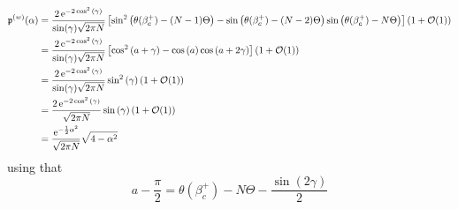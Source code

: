 \begin{align}
		\mathfrak{p}^{(w)}(\alpha) & =  \frac{2 \operatorname{e}^{-2\cos^2{(\gamma)}}}{\sin(\gamma) \sqrt{2\pi N}} \left[\sin^2{\left(\theta(\beta_c^+)-(N-1)\Theta \right)} - \sin{\left(\theta(\beta_c^+)-(N-2)\Theta\right)}  \sin{\left(\theta(\beta_c^+)-N\Theta \right)} \right] \left(1 + \mathcal{O}(1) \right) \\
		& =  \frac{2 \operatorname{e}^{-2\cos^2{(\gamma)}}}{\sin(\gamma) \sqrt{2\pi N}} \left[\cos^2{\left(a + \gamma \right)} - \cos{\left( a \right)} \cos{\left(a + 2\gamma \right)}  \right] \left(1 + \mathcal{O}(1) \right) \\
		& =  \frac{2 \operatorname{e}^{-2\cos^2{(\gamma)}}}{\sin(\gamma) \sqrt{2\pi N}} \sin^2{(\gamma)} \left(1 + \mathcal{O}(1) \right) \\
		& = \frac{2 \operatorname{e}^{-2\cos^2{(\gamma)}}}{ \sqrt{2\pi N}} \sin{(\gamma)} \left(1 + \mathcal{O}(1) \right) \\
		& = \frac{\operatorname{e}^{-\frac{1}{2}\alpha^2}}{\sqrt{2\pi N}} \sqrt{4 - \alpha^2}
\end{align}
using that
\begin{equation}
	a - \frac{\pi}{2} = \theta(\beta_c^+) - N \Theta - \frac{\sin{(2\gamma)}}{2}
\end{equation}